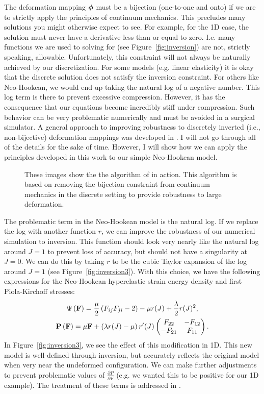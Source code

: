 The deformation mapping $\boldsymbol{\phi}$ must be a bijection (one-to-one and onto) if we are to strictly apply the principles of continuum mechanics. This precludes many solutions you might otherwise expect to see. For example, for the 1D case, the solution must never have a derivative less than or equal to zero. I.e. many functions we are used to solving for (see Figure~\ref{fig:inversion}) are not, strictly speaking, allowable. Unfortunately, this constraint will not always be naturally achieved by our discretization. For some models (e.g. linear elasticity) it is okay that the discrete solution does not satisfy the inversion constraint. For others like Neo-Hookean, we would end up taking the natural log of a negative number. This log term is there to prevent excessive compression. However, it has the consequence that our equations become incredibly stiff under compression. Such behavior can be very problematic numerically and must be avoided in a surgical simulator. A general approach to improving robustness to discretely inverted (i.e., non-bijective) deformation mappings was developed in \cite{Irving06}. I will not go through all of the details for the sake of time. However, I will show how we can apply the principles developed in this work to our simple Neo-Hookean model.

\begin{figure}
\caption{These images show the the algorithm of \cite{Irving06} in action. This algorithm is based on removing the bijection constraint from continuum mechanics in the discrete setting to provide robustness to large deformation.}
\end{figure}

The problematic term in the Neo-Hookean model is the natural log. If we replace the log with another function $r$, we can improve the robustness of our numerical simulation to inversion. This function should look very nearly like the natural log around $J = 1$ to prevent loss of accuracy, but should not have a singularity at $J = 0$. We can do this by taking $r$ to be the cubic Taylor expansion of the log around $J = 1$ (see Figure~\ref{fig:inversion3}). With this choice, we have the following expressions for the Neo-Hookean hyperelastic strain energy density and first Piola-Kirchoff stresses:
\begin{gather*}
\Psi \left( \mathbf{F} \right) = \frac{\mu}{2} \left( F_{ij} F_{ji} - 2 \right) - \mu r(J) + \frac{\lambda}{2} r(J)^2, \\
\mathbf{P} \left( \mathbf{F} \right) = \mu \mathbf{F} + \left( \lambda r(J) -\mu \right) r'(J) \begin{pmatrix} F_{22} & -F_{12} \\
-F_{21} & F_{11} \end{pmatrix}.
\end{gather*}
In Figure~\ref{fig:inversion3}, we see the effect of this modification in 1D. This new model is well-defined through inversion, but accurately reflects the original model when very near the undeformed configuration. We can make further adjustments to prevent problematic values of $\frac{\partial P}{\partial F}$ (e.g. we wanted this to be positive for our 1D example). The treatment of these terms is addressed in \cite{Teran05a}.


